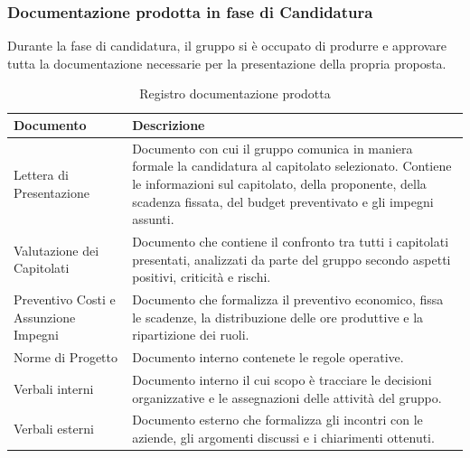 \subsubsection{Documentazione prodotta in fase di Candidatura}
Durante la fase di candidatura, il gruppo si è occupato di produrre e approvare tutta la documentazione necessarie per la presentazione della propria proposta.

\begin{table}[htbp]
	\centering
	\caption{Registro documentazione prodotta}
	\label{tab:documenti}
	\renewcommand{\arraystretch}{1.3}
	\small
	\begin{tabularx}{\textwidth}{|>{\centering\arraybackslash}p{4.5cm}
			|X|}
		\hline
		\rowcolor[gray]{0.88}
		\textbf{Documento} &
		\centering\arraybackslash\textbf{Descrizione} \\
		\hline
		Lettera di Presentazione & Documento con cui il gruppo comunica in maniera formale la candidatura al capitolato selezionato. Contiene le informazioni sul capitolato, della proponente, della scadenza fissata, del budget preventivato e gli impegni assunti. \\ \hline
		Valutazione dei Capitolati & Documento che contiene il confronto tra tutti i capitolati presentati, analizzati da parte del gruppo secondo aspetti positivi, criticità e rischi. \\ \hline
		Preventivo Costi e Assunzione Impegni & Documento che formalizza il preventivo economico, fissa le scadenze, la distribuzione delle ore produttive e la ripartizione dei ruoli.  \\ \hline
		Norme di Progetto & Documento interno contenete le regole operative. \\ \hline
		Verbali interni & Documento interno il cui scopo è tracciare le decisioni organizzative e le assegnazioni delle attività del gruppo. \\ \hline
		Verbali esterni & Documento esterno che formalizza gli incontri con le aziende, gli argomenti discussi e i chiarimenti ottenuti. \\ \hline
	\end{tabularx}
\end{table}